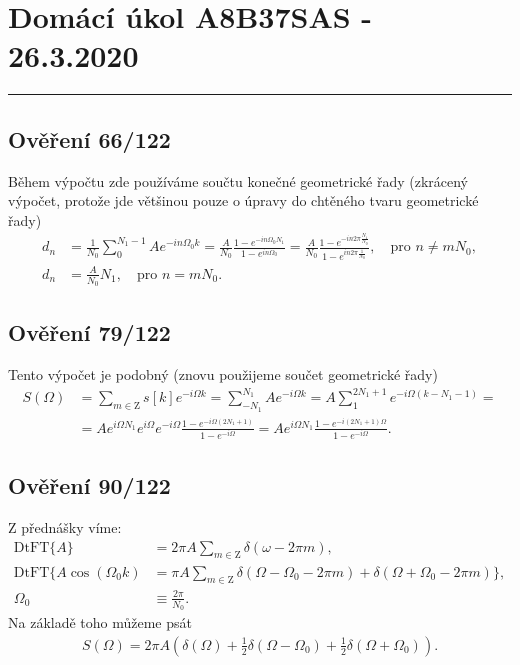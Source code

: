 \documentclass[11pt, a4paper]{article}
\begin{document}
	
	
	\section*{Domácí úkol A8B37SAS - 26.3.2020}
	\noindent\rule{12cm}{0.2pt}
	
	\subsection*{Ověření 66/122}
		
		\noindent
		Během výpočtu zde používáme součtu konečné geometrické řady (zkrácený výpočet, protože jde většinou pouze o úpravy do chtěného tvaru geometrické řady)
		\begin{align}
			d_n &= \frac{1}{N_0} \sum_{0}^{N_1-1} A e^{-i n \Omega_0 k} = \frac{A}{N_0} \frac{1-e^{-in\Omega_0 N_1}}{1-e^{in \Omega_0}} = \frac{A}{N_0} \frac{1-e^{-in 2 \pi \frac{N_1}{N_0}}}{1-e^{in 2\pi \frac{1}{N_0}}}, \quad \text{pro } n \not= mN_0,
		\\
			d_n &= \frac{A}{N_0} N_1, \quad \text{pro } n=mN_0.
		\end{align}
	
	\subsection*{Ověření 79/122}
		
		\noindent
		Tento výpočet je podobný (znovu použijeme součet geometrické řady)
		\begin{align}
			S(\Omega) &= \sum_{m \in \mathrm Z} s[k] e^{-i\Omega k} = \sum_{-N_1}^{N_1} A e^{-i\Omega k} = A\sum_{1}^{2N_1+1} e^{-i\Omega(k-N_1-1)} =
		\\
			&= A e^{i \Omega N_1} e^{i \Omega} e^{-i \Omega} \frac{1 - e^{-i\Omega(2N_1+1)}}{1-e^{-i\Omega}} = A e^{i\Omega N_1} \frac{1 - e^{-i(2N_1+1)\Omega}}{1-e^{-i\Omega}}.
		\end{align}
	
	\subsection*{Ověření 90/122}
	
		\noindent
		Z přednášky víme:
		\begin{align*}
			\mathrm{DtFT}\{A\} &= 2\pi A \sum_{m \in \mathrm Z} \delta(\omega-2\pi m),
		\\
			\mathrm{DtFT}\{ A\cos(\Omega_0 k) &= \pi A \sum_{m \in \mathrm Z} \delta(\Omega-\Omega_0-2\pi m) + \delta(\Omega+\Omega_0-2\pi m) \},
		\\
			\Omega_0 &\equiv \frac{2 \pi}{N_0}.
		\end{align*}
		Na základě toho můžeme psát
		\begin{align}
			S(\Omega) = 2 \pi A (\delta(\Omega) + \frac 12 \delta(\Omega - \Omega_0) + \frac 12 \delta(\Omega + \Omega_0)).
		\end{align}
	
\end{document}
